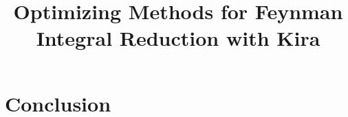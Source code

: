 \documentclass[11pt,a4paper]{article}
\title{Optimizing Methods for Feynman Integral Reduction with Kira}
\author{}
\date{}
\begin{document}
\maketitle









\section{Conclusion}
\label{sec:conclusion}

\appendix













\end{document}
